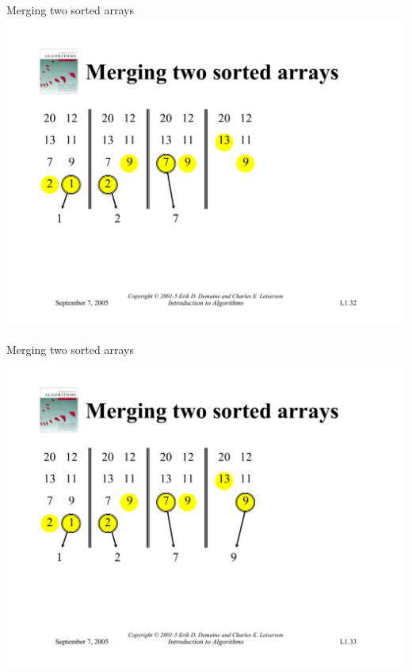 \documentclass{beamer}
\begin{document}
\begin{frame}{Merging two sorted arrays}
    \centering
    \includegraphics[width=\textwidth, trim={1.1cm 6cm 1.1cm 4.95cm}, clip]{pages/lec1_32}
\end{frame}
\begin{frame}{Merging two sorted arrays}
    \centering
    \includegraphics[width=\textwidth, trim={1.1cm 6cm 1.1cm 4.95cm}, clip]{pages/lec1_33}
\end{frame}
\end{document}
